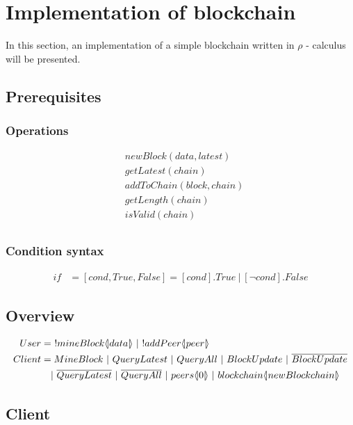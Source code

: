 \section{Implementation of blockchain}
In this section, an implementation of a simple blockchain written in $\rho$ - calculus will be presented.

\subsection{Prerequisites}

\subsubsection{Operations}

\begin{align*}
    &newBlock(data,latest)\\
    &getLatest(chain)\\
    &addToChain(block,chain)\\
    &getLength(chain)\\
    &isValid(chain)\\
\end{align*}

\subsubsection{Condition syntax}

\begin{align*}
    if &= [cond,True,False] = [cond].True\ |\ [\neg cond].False
\end{align*}

\subsection{Overview}


\begin{align*}
    User &=\ !mineBlock \lift{}{data}\ |\ !addPeer\lift{}{peer}\\
    Client &= MineBlock\ |\ QueryLatest\ |\ QueryAll\ |\ BlockUpdate\ |\ \overline{BlockUpdate}\\
    &\quad |\ \overline{QueryLatest}\ |\ \overline{QueryAll}\ |\ peers\lift{}{0}\ |\ blockchain\lift{}{newBlockchain}
\end{align*}

\subsection{Client}

